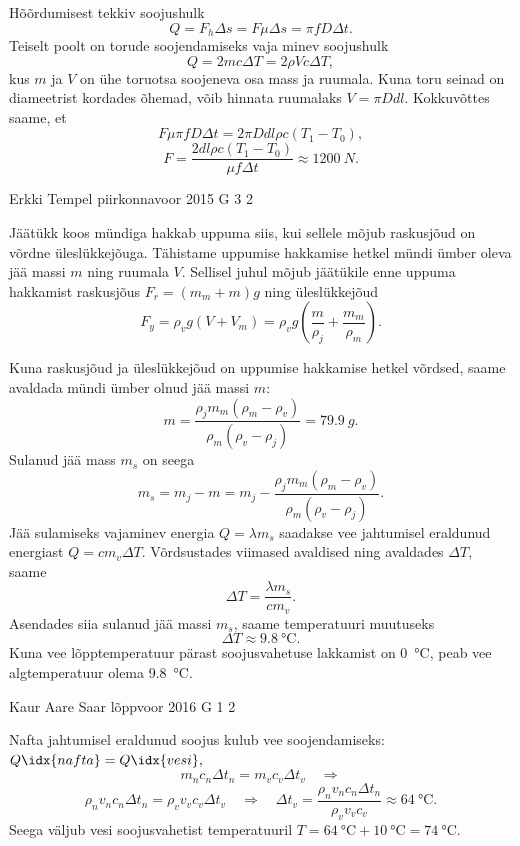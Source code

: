 \documentclass[11pt]{article}
\begin{document}
{{\ifSolution
Hõõrdumisest tekkiv soojushulk
\[
Q = F_h \Delta s = F \mu \Delta s = \pi f D \Delta t.
\]
Teiselt poolt on torude soojendamiseks vaja minev soojushulk
\[
Q = 2 m c \Delta T = 2 \rho V c \Delta T,
\]
kus $m$ ja $V$ on ühe toruotsa soojeneva osa mass ja ruumala. Kuna toru seinad on diameetrist kordades õhemad, võib hinnata ruumalaks $V = \pi D d l$. Kokkuvõttes saame, et
\[
F \mu \pi f D \Delta t = 2 \pi D d l \rho c ( T_1 - T_0 ),
\]
\[
F = \frac{2 d l \rho c ( T_1 - T_0 )}{ \mu f \Delta t } \approx \SI{1200}{N}.
\]
\fi
}

{Erkki Tempel} %
{piirkonnavoor} %
{2015} %
{G 3} %
{2} %
{

\ifSolution
Jäätükk koos mündiga hakkab uppuma siis, kui sellele mõjub raskusjõud on võrdne üleslükkejõuga. Tähistame uppumise hakkamise hetkel mündi ümber oleva jää massi $m$ ning ruumala $V$. Sellisel juhul mõjub jäätükile enne uppuma hakkamist raskusjõus $F_r=(m_m+m)g$ ning üleslükkejõud
\[ F_y=\rho_v g(V + V_m)=\rho_v g\left(\frac{m}{\rho_j} + \frac{m_m}{\rho_m}\right). \]

Kuna raskusjõud ja üleslükkejõud on uppumise hakkamise hetkel võrdsed, saame avaldada mündi ümber olnud jää massi $m$:
\[ m = \frac{\rho_j m_m(\rho_m - \rho_v)}{\rho_m(\rho_v - \rho_j)} = \SI{79,9}{g}. \]
Sulanud jää mass $m_s$ on seega
\[ m_s = m_j - m = m_j - \frac{\rho_j m_m(\rho_m - \rho_v)}{\rho_m(\rho_v - \rho_j)}. \]
Jää sulamiseks vajaminev energia $Q=\lambda m_s$ saadakse vee jahtumisel eraldunud energiast $Q=cm_v\Delta T$. Võrdsustades viimased avaldised ning avaldades $\Delta T$, saame
\[ \Delta T = \frac{\lambda m_s}{cm_v}. \]
Asendades siia sulanud jää massi $m_s$, saame temperatuuri muutuseks
\[ \Delta T \approx \SI{9,8}{\celsius}. \]
Kuna vee lõpptemperatuur pärast soojusvahetuse lakkamist on \SI{0}{\celsius}, peab vee algtemperatuur olema \SI{9,8}{\celsius}.
\fi
}

{Kaur Aare Saar} %
{lõppvoor} %
{2016} %
{G 1} %
{2} %
{

\ifSolution
Nafta jahtumisel eraldunud soojus kulub vee soojendamiseks: $Q\idx{nafta} = Q\idx{vesi},$
\[ m_nc_n\Delta t_n = m_vc_v\Delta t_v \quad\Rightarrow \]
\[ \rho_nv_nc_n\Delta t_n = \rho_v v_vc_v\Delta t_v \quad\Rightarrow\quad \Delta t_v = \frac{\rho_nv_nc_n\Delta t_n}{\rho_vv_vc_v} \approx \SI{64}{\celsius}. \]
Seega väljub vesi soojusvahetist temperatuuril $T = \SI{64}{\celsius} + \SI{10}{\celsius} = \SI{74}{\celsius}$.
\fi
}

}
\end{document}
